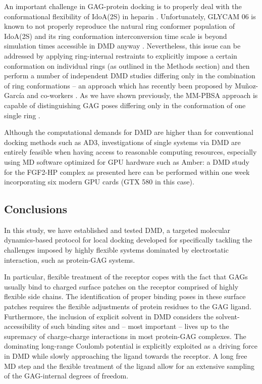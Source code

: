 An important challenge in GAG-protein docking is to properly deal with the
conformational flexibility of IdoA(2S) in heparin
\cite{Mulloy_dyn_conf_heparin_2000, barbero_jacs_2005}. Unfortunately, GLYCAM 06
is known to not properly reproduce the natural ring conformer population of
IdoA(2S) \cite{gandhi_idoa2s_2010} and its ring conformation interconversion
time scale is beyond simulation times accessible in DMD anyway
\cite{almond_jacs_2010}. Nevertheless, this issue can be addressed by applying
ring-internal restraints to explicitly impose a certain conformation on
individual rings (as outlined in the Methods section) and then perform a number
of independent DMD studies differing only in the combination of ring
conformations -- an approach which has recently been proposed by Muñoz-García
and co-workers {\cite{conf_idoa_timeavg_restraints_2013}}. As we have shown
previously, the MM-PBSA approach is capable of distinguishing GAG poses
differing only in the conformation of one single ring
\cite{Samsonov_rings_cr_2013}.

Although the computational demands for DMD are higher than for conventional
docking methods such as AD3, investigations of single systems via DMD are
entirely feasible when having access to reasonable computing resources,
especially using MD software optimized for GPU hardware such as Amber: a DMD
study for the FGF2-HP complex as presented here can be performed within one week
incorporating six modern GPU cards (GTX 580 in this case).

\subsection{Conclusions}

In this study, we have established and tested DMD, a targeted molecular
dynamics-based protocol for local docking developed for specifically tackling
the challenges imposed by highly flexible systems dominated by electrostatic
interaction, such as protein-GAG systems.

In particular, flexible treatment of the receptor copes with the fact that GAGs
usually bind to charged surface patches on the receptor comprised of highly
flexible side chains. The identification of proper binding poses in these
surface patches requires the flexible adjustments of protein residues to the GAG
ligand. Furthermore, the inclusion of explicit solvent in DMD considers the
solvent-accessibility of such binding sites and -- most important -- lives up to
the supremacy of charge-charge interactions in most protein-GAG complexes. The
dominating long-range Coulomb potential is explicitly exploited as a driving
force in DMD while slowly approaching the ligand towards the receptor. A long
free MD step and the flexible treatment of the ligand allow for an extensive
sampling of the GAG-internal degrees of freedom.

